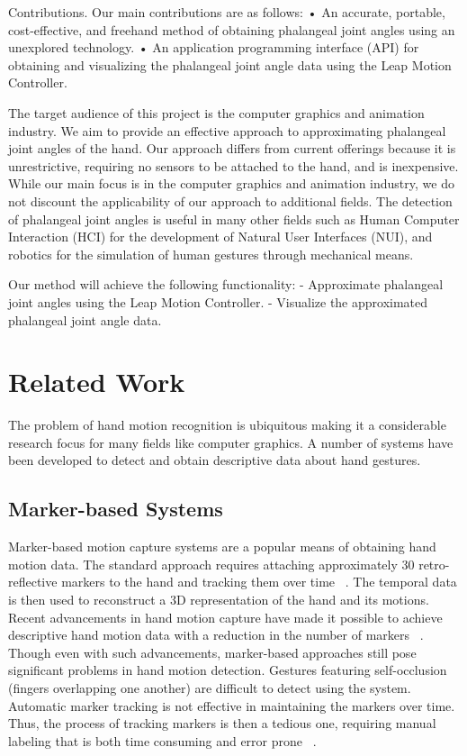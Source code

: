 \documentclass[review]{acmsiggraph}
\begin{document}
Contributions.
Our main contributions are as follows:
• An accurate, portable, cost-effective, and freehand
method of obtaining phalangeal joint angles using an
unexplored technology.
• An application programming interface (API) for obtaining
and visualizing the phalangeal joint angle data
using the Leap Motion Controller.

The target audience of this project is the computer
graphics and animation industry. We aim to provide an
effective approach to approximating phalangeal joint angles
of the hand. Our approach differs from current offerings
because it is unrestrictive, requiring no sensors to be
attached to the hand, and is inexpensive. While our main
focus is in the computer graphics and animation industry,
we do not discount the applicability of our approach to
additional fields. The detection of phalangeal joint angles is
useful in many other fields such as Human Computer Interaction
(HCI) for the development of Natural User Interfaces
(NUI), and robotics for the simulation of human gestures
through mechanical means.

Our method will achieve the following functionality:
- Approximate phalangeal joint angles using the Leap
Motion Controller.
- Visualize the approximated phalangeal joint angle
data.

\section{Related Work}

The problem of hand motion recognition is ubiquitous
making it a considerable research focus for many fields like
computer graphics. A number of systems have been developed
to detect and obtain descriptive data about hand gestures.

\subsection{Marker-based Systems}

Marker-based motion capture systems are a popular
means of obtaining hand motion data. The standard approach
requires attaching approximately 30 retro-reflective
markers to the hand and tracking them over time ~\cite{VIC}.
The temporal data is then used to reconstruct a 3D representation
of the hand and its motions.
Recent advancements in hand motion capture have made
it possible to achieve descriptive hand motion data with a
reduction in the number of markers ~\cite{HRM12}. Though
even with such advancements, marker-based approaches
still pose significant problems in hand motion detection.
Gestures featuring self-occlusion (fingers overlapping one
another) are difficult to detect using the system. Automatic
marker tracking is not effective in maintaining the markers
over time. Thus, the process of tracking markers is then a
tedious one, requiring manual labeling that is both time consuming
and error prone ~\cite{ZCX12}.
\end{document}
